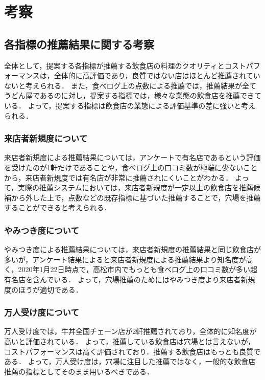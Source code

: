 \chapter{考察}

\label{chap:discussion}

\section{各指標の推薦結果に関する考察}
全体として，提案する各指標が推薦する飲食店の料理のクオリティとコストパフォーマンスは，全体的に高評価であり，良質ではない店はほとんど推薦されていないと考えられる．
また，食べログ上の点数による推薦では，推薦結果が全てうどん屋であるのに対し，提案する指標では，様々な業態の飲食店を推薦できている．
よって，提案する指標は飲食店の業態による評価基準の差に強いと考えられる．\par
\subsection{来店者新規度について}
来店者新規度による推薦結果については，アンケートで有名店であるという評価を受けたのが1軒だけであることや，食べログ上の口コミ数が極端に少ないことから，来店者新規度では有名店が非常に推薦されにくいことがわかる．
よって，実際の推薦システムにおいては，来店者新規度が一定以上の飲食店を推薦候補から外した上で，点数などの既存指標に基づいた推薦することで，穴場を推薦することができると考えられる．\par

\subsection{やみつき度について}
やみつき度による推薦結果については，来店者新規度の推薦結果と同じ飲食店が多いが，アンケート結果によると来店者新規度による推薦結果より知名度が高く，2020年1月22日時点で，高松市内でもっとも食べログ上の口コミ数が多い超有名店を含んでいる．
よって，穴場推薦のためにはやみつき度より来店者新規度のほうが適切である．\par

\subsection{万人受け度について}
万人受け度では，牛丼全国チェーン店が2軒推薦されており，全体的に知名度が高いと評価されている．
よって，推薦している飲食店は穴場とは言えないが，コストパフォーマンスは高く評価されており．推薦する飲食店はもっとも良質である．
よって，万人受け度は，穴場に注目した推薦ではなく，一般的な飲食店推薦の指標としてそのまま用いるべきである．

